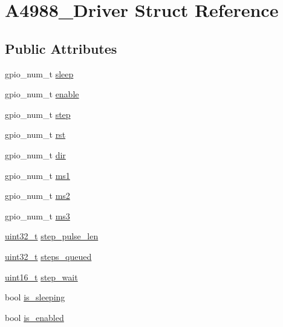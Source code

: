\hypertarget{structA4988__Driver}{}\section{A4988\+\_\+\+Driver Struct Reference}
\label{structA4988__Driver}
\subsection*{Public Attributes}
\begin{DoxyCompactItemize}
\item 
gpio\+\_\+num\+\_\+t \hyperlink{structA4988__Driver_ad70b2030eb7693eaa687f27af7889969}{sleep}
\item 
gpio\+\_\+num\+\_\+t \hyperlink{structA4988__Driver_a3f1250fca864ff2fa4b11a644cdcab17}{enable}
\item 
gpio\+\_\+num\+\_\+t \hyperlink{structA4988__Driver_a4209422243dd83633849726f74b40e7c}{step}
\item 
gpio\+\_\+num\+\_\+t \hyperlink{structA4988__Driver_a496834da227b845b4eaf969e726a177b}{rst}
\item 
gpio\+\_\+num\+\_\+t \hyperlink{structA4988__Driver_a52bcf5bee0f17eb8c8cfada6b74ce52f}{dir}
\item 
gpio\+\_\+num\+\_\+t \hyperlink{structA4988__Driver_a25111ec2990df3c0746cbd8850159d6b}{ms1}
\item 
gpio\+\_\+num\+\_\+t \hyperlink{structA4988__Driver_abb7be73306c0a811d8de796b75636fd9}{ms2}
\item 
gpio\+\_\+num\+\_\+t \hyperlink{structA4988__Driver_a2c218a9775018210e5683878894a3b7f}{ms3}
\item 
\hyperlink{vl53l0x__types_8h_a435d1572bf3f880d55459d9805097f62}{uint32\+\_\+t} \hyperlink{structA4988__Driver_ac99aedce09cf5509d686e81cb896fd6e}{step\+\_\+pulse\+\_\+len}
\item 
\hyperlink{vl53l0x__types_8h_a435d1572bf3f880d55459d9805097f62}{uint32\+\_\+t} \hyperlink{structA4988__Driver_a14b08b6fabc9476b36d6a9330a0c83b2}{steps\+\_\+queued}
\item 
\hyperlink{vl53l0x__types_8h_a273cf69d639a59973b6019625df33e30}{uint16\+\_\+t} \hyperlink{structA4988__Driver_a8d74f296177a2d3cf892d09ee816976a}{step\+\_\+wait}
\item 
bool \hyperlink{structA4988__Driver_a9da128c86e373e260a347c0b786be0f0}{is\+\_\+sleeping}
\item 
bool \hyperlink{structA4988__Driver_a7c891a319728c2cc12eb228885c64dee}{is\+\_\+enabled}

\end{DoxyCompactItemize}
